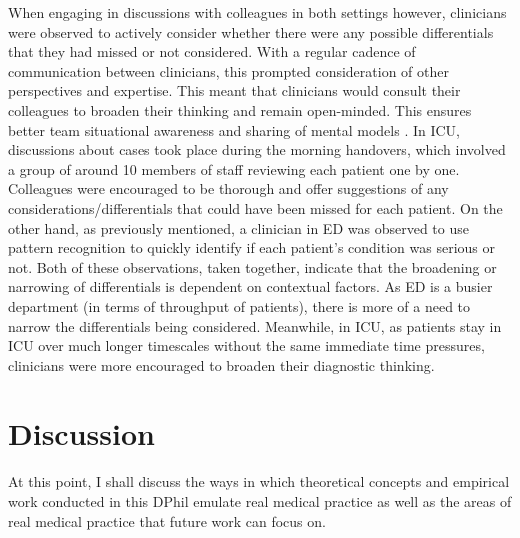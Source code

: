 \documentclass[a4paper, nobind]{templates/ociamthesis}
\begin{document}
\hfill\break
When engaging in discussions with colleagues in both settings however, clinicians were observed to actively consider whether there were any possible differentials that they had missed or not considered. With a regular cadence of communication between clinicians, this prompted consideration of other perspectives and expertise. This meant that clinicians would consult their colleagues to broaden their thinking and remain open-minded. This ensures better team situational awareness \autocite{salas_situation_1995} and sharing of mental models \autocite{alby_diagnostic_2015}. In ICU, discussions about cases took place during the morning handovers, which involved a group of around 10 members of staff reviewing each patient one by one. Colleagues were encouraged to be thorough and offer suggestions of any considerations/differentials that could have been missed for each patient. On the other hand, as previously mentioned, a clinician in ED was observed to use pattern recognition to quickly identify if each patient's condition was serious or not. Both of these observations, taken together, indicate that the broadening or narrowing of differentials is dependent on contextual factors. As ED is a busier department (in terms of throughput of patients), there is more of a need to narrow the differentials being considered. Meanwhile, in ICU, as patients stay in ICU over much longer timescales without the same immediate time pressures, clinicians were more encouraged to broaden their diagnostic thinking.

\section*{Discussion}\label{discussion-4}

At this point, I shall discuss the ways in which theoretical concepts and empirical work conducted in this DPhil emulate real medical practice as well as the areas of real medical practice that future work can focus on.
\end{document}
